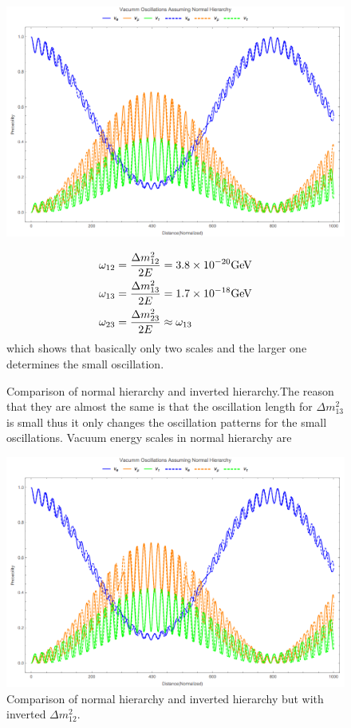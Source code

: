 \documentclass[letterpaper,12pt,english]{sphinxmanual}
\begin{document}
\begin{figure}[htbp]
\centering
\capstart

\includegraphics{vacOscNormInvComp.png}
\caption{Comparison of normal hierarchy and inverted hierarchy.The reason that they are almost the same is that the oscillation length for \(\Delta m_{13}^2\) is small thus it only changes the oscillation patterns for the small oscillations. Vacuum energy scales in normal hierarchy are}{\small \begin{gather}
\begin{split}\omega_{12} &= \frac{\Delta m_{12}^2}{2E} = 3.8\times 10^{-20}\mathrm{GeV} \\
\omega_{13} &= \frac{\Delta m_{13}^2}{2E} = 1.7\times 10^{-18}\mathrm{GeV} \\
\omega_{23} &= \frac{\Delta m_{23}^2}{2E} \approx \omega_{13}\end{split}\notag
\end{gather}
which shows that basically only two scales and the larger one determines the small oscillation.
}\end{figure}
\begin{figure}[htbp]
\centering
\capstart

\includegraphics{vacOscNormInvComp-Invert12.png}
\caption{Comparison of normal hierarchy and inverted hierarchy but with inverted \(\Delta m_{12}^2\).}\end{figure}
\end{document}
